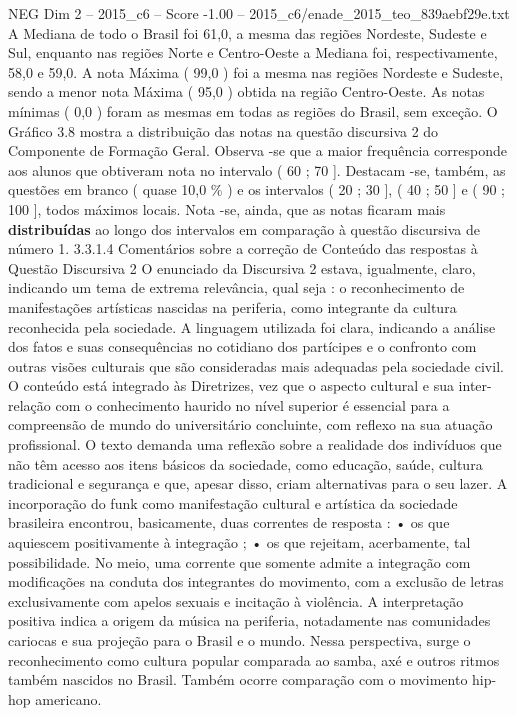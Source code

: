 \begin{textsample}{NEG Dim 2 – 2015\_c6 – Score -1.00 – 2015\_c6/enade\_2015\_teo\_839aebf29e.txt}
A Mediana de todo o Brasil foi 61,0, a mesma das regiões Nordeste, Sudeste e Sul, enquanto nas regiões Norte e Centro-Oeste a Mediana foi, respectivamente, 58,0 e 59,0.
A nota Máxima ( 99,0 ) foi a mesma nas regiões Nordeste e Sudeste, sendo a menor nota Máxima ( 95,0 ) obtida na região Centro-Oeste.
As notas mínimas ( 0,0 ) foram as mesmas em todas as regiões do Brasil, sem exceção.
O Gráfico 3.8 mostra a distribuição das notas na questão discursiva 2 do Componente de Formação Geral.
Observa -se que a maior frequência corresponde aos alunos que obtiveram nota no intervalo ( 60 ; 70 ].
Destacam -se, também, as questões em branco ( quase 10,0 \% ) e os intervalos ( 20 ; 30 ], ( 40 ; 50 ] e ( 90 ; 100 ], todos máximos locais.
Nota -se, ainda, que as notas ficaram mais \textbf{distribuídas} ao longo dos intervalos em comparação à questão discursiva de número 1. 3.3.1.4 Comentários sobre a correção de Conteúdo das respostas à Questão Discursiva 2 O enunciado da Discursiva 2 estava, igualmente, claro, indicando um tema de extrema relevância, qual seja : o reconhecimento de manifestações artísticas nascidas na periferia, como integrante da cultura reconhecida pela sociedade.
A linguagem utilizada foi clara, indicando a análise dos fatos e suas consequências no cotidiano dos partícipes e o confronto com outras visões culturais que são consideradas mais adequadas pela sociedade civil.
O conteúdo está integrado às Diretrizes, vez que o aspecto cultural e sua inter-relação com o conhecimento haurido no nível superior é essencial para a compreensão de mundo do universitário concluinte, com reflexo na sua atuação profissional.
O texto demanda uma reflexão sobre a realidade dos indivíduos que não têm acesso aos itens básicos da sociedade, como educação, saúde, cultura tradicional e segurança e que, apesar disso, criam alternativas para o seu lazer.
A incorporação do funk como manifestação cultural e artística da sociedade brasileira encontrou, basicamente, duas correntes de resposta : • os que aquiescem positivamente à integração ; • os que rejeitam, acerbamente, tal possibilidade.
No meio, uma corrente que somente admite a integração com modificações na conduta dos integrantes do movimento, com a exclusão de letras exclusivamente com apelos sexuais e incitação à violência.
A interpretação positiva indica a origem da música na periferia, notadamente nas comunidades cariocas e sua projeção para o Brasil e o mundo.
Nessa perspectiva, surge o reconhecimento como cultura popular comparada ao samba, axé e outros ritmos também nascidos no Brasil.
Também ocorre comparação com o movimento hip-hop americano.

\end{textsample}
